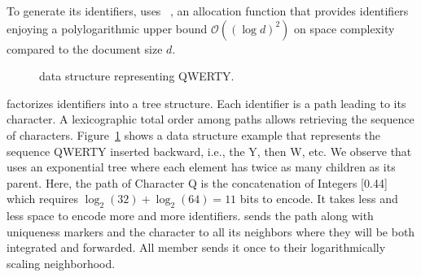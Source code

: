

To generate its identifiers, \CRATE uses \LSEQ~\cite{nedelec2013lseq}, an
allocation function that provides identifiers enjoying a polylogarithmic upper
bound $\mathcal{O}((\log d)^2)$ on space complexity compared to the document
size $d$. 

\begin{figure}
  \centering
  
  \caption{\label{fig:lseqexample}\LSEQ data structure representing QWERTY.}
\end{figure}

\LSEQ factorizes identifiers into a tree structure. Each identifier is a path
leading to its character. A lexicographic total order among paths allows
retrieving the sequence of characters. Figure~\ref{fig:lseqexample} shows a data
structure example that represents the sequence QWERTY inserted backward, i.e.,
the Y, then W, etc. We observe that \LSEQ uses an exponential tree where each
element has twice as many children as its parent. Here, the path of Character Q
is the concatenation of Integers [0.44] which requires
$\log_2(32)+\log_2(64)=11$ bits to encode. It takes less and less space to
encode more and more identifiers. \CRATE sends the path along with uniqueness
markers and the character to all its neighbors where they will be both
integrated and forwarded. All member sends it once to their logarithmically
scaling neighborhood.

